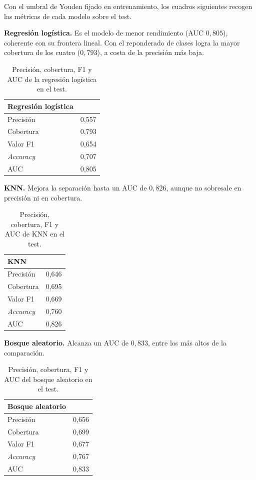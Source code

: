 \documentclass[12pt,a4paper]{report}
\theoremstyle{definition}
\begin{document}
Con el umbral de Youden fijado en entrenamiento, los cuadros siguientes recogen las métricas de cada
modelo sobre el test.

\textbf{Regresión logística.} Es el modelo de menor rendimiento (AUC $0{,}805$), coherente con su
frontera lineal. Con el reponderado de clases logra la mayor cobertura de los cuatro ($0{,}793$), a
costa de la precisión más baja.

\begin{table}[H]
\centering\small
\begin{tabular}{lc}
\toprule
Regresión logística & \\
\midrule
Precisión & 0,557 \\
Cobertura & 0,793 \\
Valor F1 & 0,654 \\
\emph{Accuracy} & 0,707 \\
AUC & 0,805 \\
\bottomrule
\end{tabular}
\caption{Precisión, cobertura, F1 y AUC de la regresión logística en el test.}
\label{tab:met-lr}
\end{table}

\textbf{KNN.} Mejora la separación hasta un AUC de $0{,}826$, aunque no sobresale en precisión ni en cobertura.

\begin{table}[H]
\centering\small
\begin{tabular}{lc}
\toprule
KNN & \\
\midrule
Precisión & 0,646 \\
Cobertura & 0,695 \\
Valor F1 & 0,669 \\
\emph{Accuracy} & 0,760 \\
AUC & 0,826 \\
\bottomrule
\end{tabular}
\caption{Precisión, cobertura, F1 y AUC de KNN en el test.}
\label{tab:met-knn}
\end{table}

\textbf{Bosque aleatorio.} Alcanza un AUC de $0{,}833$, entre los más altos de la comparación.

\begin{table}[H]
\centering\small
\begin{tabular}{lc}
\toprule
Bosque aleatorio & \\
\midrule
Precisión & 0,656 \\
Cobertura & 0,699 \\
Valor F1 & 0,677 \\
\emph{Accuracy} & 0,767 \\
AUC & 0,833 \\
\bottomrule
\end{tabular}
\caption{Precisión, cobertura, F1 y AUC del bosque aleatorio en el test.}
\label{tab:met-rf}
\end{table}
\end{document}
